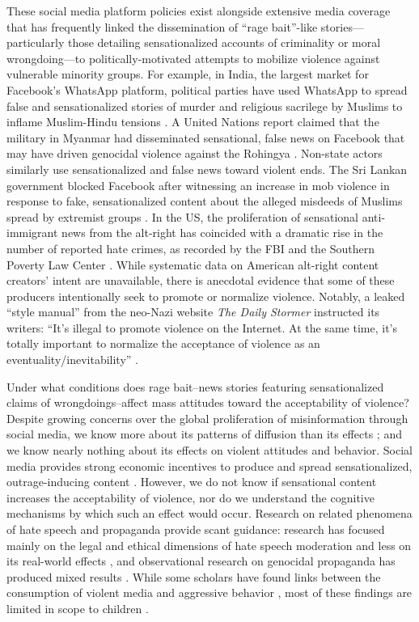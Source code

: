 These social media platform policies exist alongside extensive media coverage that has frequently linked the dissemination of ``rage bait''-like stories---particularly those detailing sensationalized accounts of criminality or moral wrongdoing---to politically-motivated attempts to mobilize violence against vulnerable minority groups. For example, in India, the largest market for Facebook's WhatsApp platform, political parties have used WhatsApp to spread false and sensationalized stories of murder and religious sacrilege by Muslims to inflame Muslim-Hindu tensions \citep{parth2018}. A United Nations report claimed that the military in Myanmar had disseminated sensational, false news on Facebook that may have driven genocidal violence against the Rohingya \citep{mozur2018}. Non-state actors similarly use sensationalized and false news toward violent ends. The Sri Lankan government blocked Facebook after witnessing an increase in mob violence in response to fake, sensationalized content about the alleged misdeeds of Muslims spread by extremist groups \citep{goel2018b}. In the US, the proliferation of sensational anti-immigrant news from the alt-right has coincided with a dramatic rise in the number of reported hate crimes, as recorded by the FBI and the Southern Poverty Law Center \citep{barrett_2018}. While systematic data on American alt-right content creators' intent are unavailable, there is anecdotal evidence that some of these producers intentionally seek to promote or normalize violence. Notably, a leaked ``style manual'' from the neo-Nazi website \textit{The Daily Stormer} instructed its writers: ``It's illegal to promote violence on the Internet. At the same time, it’s totally important to normalize the acceptance of violence as an eventuality/inevitability'' \citep{feinberg2017daily}. 

Under what conditions does rage bait--news stories featuring sensationalized claims of wrongdoings--affect mass attitudes toward the acceptability of violence? Despite growing concerns over the global proliferation of misinformation through social media, we know more about its patterns of diffusion than its effects \citep{brady2017emotion, lazer2018fakenews, vosoughi2018spread}; and we know nearly nothing about its effects on violent attitudes and behavior. Social media provides strong economic incentives to produce and spread sensationalized, outrage-inducing content \citep{crockett2017moral}. However, we do not know if sensational content increases the acceptability of violence, nor do we understand the cognitive mechanisms by which such an effect would occur. Research on related phenomena of hate speech and propaganda provide scant guidance: research has focused mainly on the legal and ethical dimensions of hate speech moderation and less on its real-world effects \citep{gates1996speaking,waldron2012harm}, and observational research on genocidal propaganda has produced mixed results \citep{fujii2004transforming, hagan2008darfur,  straus2007relationship,yanagizawa2014propaganda}. While some scholars have found links between the consumption of violent media and aggressive behavior \citep{kalmoe2014fueling}, most of these findings are limited in scope to children \citep{anderson2003dissociating,drabman1974does,huesmann1994long}. 

